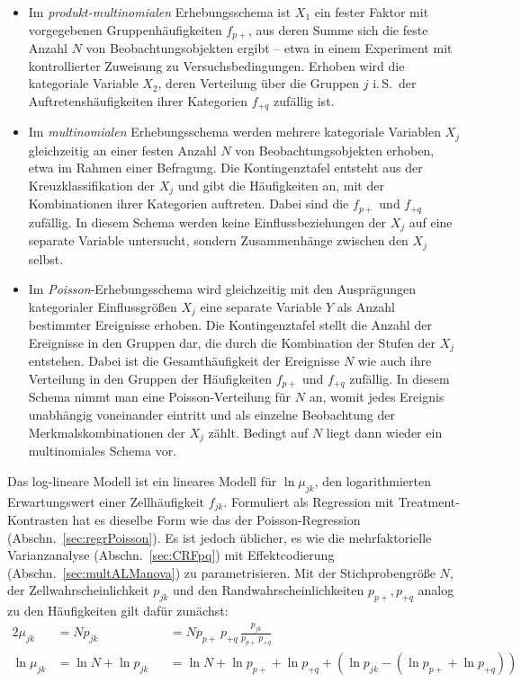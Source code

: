 \begin{itemize}
\item Im \emph{produkt-multinomialen} Erhebungsschema ist $X_{1}$ ein fester Faktor mit vorgegebenen Gruppenhäufigkeiten $f_{p+}$, aus deren Summe sich die feste Anzahl $N$ von Beobachtungsobjekten ergibt -- etwa in einem Experiment mit kontrollierter Zuweisung zu Versuchsbedingungen. Erhoben wird die kategoriale Variable $X_{2}$, deren Verteilung über die Gruppen $j$ i.\,S.\ der Auftretenshäufigkeiten ihrer Kategorien $f_{+q}$ zufällig ist.

\item Im \emph{multinomialen} Erhebungsschema werden mehrere kategoriale Variablen $X_{j}$ gleichzeitig an einer festen Anzahl $N$ von Beobachtungsobjekten erhoben, etwa im Rahmen einer Befragung. Die Kontingenztafel entsteht aus der Kreuzklassifikation der $X_{j}$ und gibt die Häufigkeiten an, mit der Kombinationen ihrer Kategorien auftreten. Dabei sind die $f_{p+}$ und $f_{+q}$ zufällig. In diesem Schema werden keine Einflussbeziehungen der $X_{j}$ auf eine separate Variable untersucht, sondern Zusammenhänge zwischen den $X_{j}$ selbst.

\item Im \emph{Poisson}-Erhebungsschema wird gleichzeitig mit den Ausprägungen kategorialer Einflussgrößen $X_{j}$ eine separate Variable $Y$ als Anzahl bestimmter Ereignisse erhoben. Die Kontingenztafel stellt die Anzahl der Ereignisse in den Gruppen dar, die durch die Kombination der Stufen der $X_{j}$ entstehen. Dabei ist die Gesamthäufigkeit der Ereignisse $N$ wie auch ihre Verteilung in den Gruppen der Häufigkeiten $f_{p+}$ und $f_{+q}$ zufällig. In diesem Schema nimmt man eine Poisson-Verteilung für $N$ an, womit jedes Ereignis unabhängig voneinander eintritt und als einzelne Beobachtung der Merkmalskombinationen der $X_{j}$ zählt. Bedingt auf $N$ liegt dann wieder ein multinomiales Schema vor.
\end{itemize}

Das log-lineare Modell ist ein lineares Modell für $\ln \mu_{jk}$, den logarithmierten Erwartungswert einer Zellhäufigkeit $f_{jk}$. Formuliert als Regression mit Treatment-Kontrasten hat es dieselbe Form wie das der Poisson-Regression (Abschn.\ \ref{sec:regrPoisson}). Es ist jedoch üblicher, es wie die mehrfaktorielle Varianzanalyse (Abschn.\ \ref{sec:CRFpq}) mit Effektcodierung (Abschn.\ \ref{sec:multALManova}) zu parametrisieren. Mit der Stichprobengröße $N$, der Zellwahrscheinlichkeit $p_{jk}$ und den Randwahrscheinlichkeiten $p_{p+}, p_{+q}$ analog zu den Häufigkeiten gilt dafür zunächst:
\begin{alignat*}{2}
\mu_{jk}     &= N p_{jk}           & &= N p_{p+} \, p_{+q} \, \frac{p_{jk}}{p_{p+} \, p_{+q}}\\
\ln \mu_{jk} &= \ln N + \ln p_{jk} & &= \ln N + \ln p_{p+} + \ln p_{+q} + (\ln p_{jk} - (\ln p_{p+} + \ln p_{+q}))
\end{alignat*}

